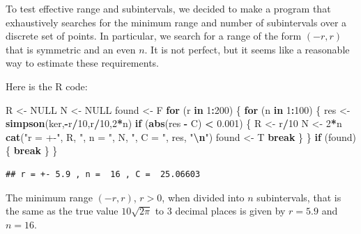 \documentclass[
]{article}
\newenvironment{Shaded}{\begin{snugshade}}{\end{snugshade}}
\newcommand{\ConstantTok}[1]{\textcolor[rgb]{0.56,0.35,0.01}{#1}}
\newcommand{\ControlFlowTok}[1]{\textcolor[rgb]{0.13,0.29,0.53}{\textbf{#1}}}
\newcommand{\DecValTok}[1]{\textcolor[rgb]{0.00,0.00,0.81}{#1}}
\newcommand{\FloatTok}[1]{\textcolor[rgb]{0.00,0.00,0.81}{#1}}
\newcommand{\FunctionTok}[1]{\textcolor[rgb]{0.13,0.29,0.53}{\textbf{#1}}}
\newcommand{\NormalTok}[1]{#1}
\newcommand{\OtherTok}[1]{\textcolor[rgb]{0.56,0.35,0.01}{#1}}
\newcommand{\SpecialCharTok}[1]{\textcolor[rgb]{0.81,0.36,0.00}{\textbf{#1}}}
\newcommand{\StringTok}[1]{\textcolor[rgb]{0.31,0.60,0.02}{#1}}
\begin{document}
To test effective range and subintervals, we decided to make a program
that exhaustively searches for the minimum range and number of
subintervals over a discrete set of points. In particular, we search for
a range of the form \((-r,r)\) that is symmetric and an even \(n\). It
is not perfect, but it seems like a reasonable way to estimate these
requirements.

Here is the R code:

\begin{Shaded}
\begin{Highlighting}[]
\NormalTok{R }\OtherTok{\textless{}{-}} \ConstantTok{NULL}
\NormalTok{N }\OtherTok{\textless{}{-}} \ConstantTok{NULL}
\NormalTok{found }\OtherTok{\textless{}{-}}\NormalTok{ F}
\ControlFlowTok{for}\NormalTok{ (r }\ControlFlowTok{in} \DecValTok{1}\SpecialCharTok{:}\DecValTok{200}\NormalTok{)}
\NormalTok{\{}
  \ControlFlowTok{for}\NormalTok{ (n }\ControlFlowTok{in} \DecValTok{1}\SpecialCharTok{:}\DecValTok{100}\NormalTok{)}
\NormalTok{  \{}
\NormalTok{    res }\OtherTok{\textless{}{-}} \FunctionTok{simpson}\NormalTok{(ker,}\SpecialCharTok{{-}}\NormalTok{r}\SpecialCharTok{/}\DecValTok{10}\NormalTok{,r}\SpecialCharTok{/}\DecValTok{10}\NormalTok{,}\DecValTok{2}\SpecialCharTok{*}\NormalTok{n)}
    \ControlFlowTok{if}\NormalTok{ (}\FunctionTok{abs}\NormalTok{(res }\SpecialCharTok{{-}}\NormalTok{ C) }\SpecialCharTok{\textless{}} \FloatTok{0.001}\NormalTok{)}
\NormalTok{    \{}
\NormalTok{      R }\OtherTok{\textless{}{-}}\NormalTok{ r}\SpecialCharTok{/}\DecValTok{10}
\NormalTok{      N }\OtherTok{\textless{}{-}} \DecValTok{2}\SpecialCharTok{*}\NormalTok{n}
      \FunctionTok{cat}\NormalTok{(}\StringTok{"r = +{-}"}\NormalTok{, R, }\StringTok{", n = "}\NormalTok{, N, }\StringTok{", C = "}\NormalTok{, res, }\StringTok{"}\SpecialCharTok{\textbackslash{}n}\StringTok{"}\NormalTok{)}
\NormalTok{      found }\OtherTok{\textless{}{-}}\NormalTok{ T}
      \ControlFlowTok{break}
\NormalTok{    \}}
\NormalTok{  \}}
  \ControlFlowTok{if}\NormalTok{ (found) \{ }\ControlFlowTok{break}\NormalTok{ \}}
\NormalTok{\}}
\end{Highlighting}
\end{Shaded}

\begin{verbatim}
## r = +- 5.9 , n =  16 , C =  25.06603
\end{verbatim}

The minimum range \((-r,r)\), \(r > 0\), when divided into \(n\)
subintervals, that is the same as the true value \(10 \sqrt{2\pi}\) to
\(3\) decimal places is given by \(r = 5.9\) and \(n = 16\).
\end{document}

